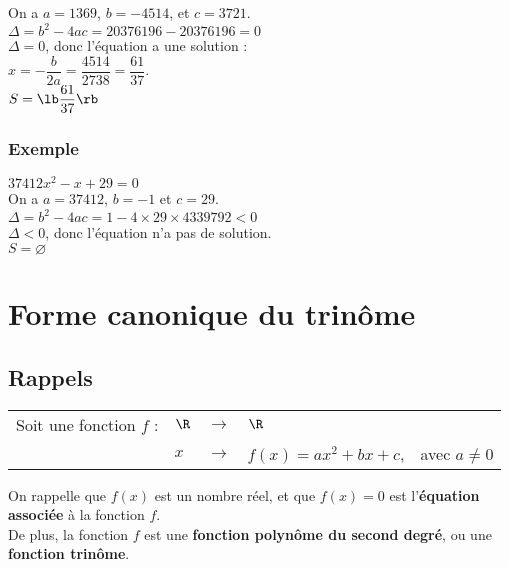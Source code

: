 On a $a = 1 369$, $b = -4 514$, et $c = 3 721$. \\

$ \Delta = b^2 - 4ac = 20 376 196 - 20 376 196 = 0$ \\

$\Delta = 0$, donc l'équation a une solution : \\

$ x = -\dfrac{b}{2a} = \dfrac{4 514}{2 738} = \dfrac{61}{37}$. \\

$ S = \lb \dfrac{61}{37} \rb $ 

\subsubsection{Exemple }

$37 412x^2 -x + 29 = 0$ \\

On a $ a = 37 412$, $b = -1$ et $c = 29$. \\

$\Delta = b^2 - 4ac = 1 - 4 \times 29 \times 4 339 792 < 0$ \\

$\Delta < 0$, donc l'équation n'a pas de solution. \\

$S = \varnothing$ 

\newpage

\section{Forme canonique du trinôme}

\subsection{Rappels}

\begin{tabular}{lllll}
Soit une fonction $f$ : & $\R$ & $\longrightarrow$ & $\R$ & \\
& $x$ & $\longrightarrow$ & $f\left(x\right) = ax^2 + bx + c$, & avec $a \neq 0$ \\ 
\end{tabular}

On rappelle que $f\left(x\right)$ est un nombre réel, et que $f\left(x\right) = 0$ est l'\textbf{équation associée} à la fonction $f$. \\ De plus, la fonction $f$ est une \textbf{fonction polynôme du second degré}, ou une \textbf{fonction trinôme}. \\

